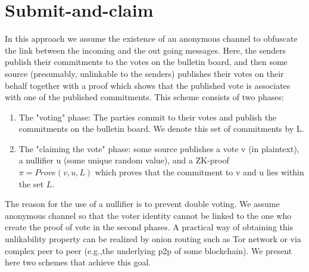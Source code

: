 \documentclass[]{article}
\begin{document}
	\section {Submit-and-claim}
	In this approach we assume the existence of an anonymous channel to obfuscate the link between the incoming and the out going messages. Here, the senders publish their commitments to the votes on the bulletin board, and then some source (presumably, unlinkable to the senders) publishes their votes on their behalf together with a proof which shows that the published vote is associates with one of the published commitments. This scheme consists of two phases:
	\begin{enumerate} 
		\item  The "voting" phase: The parties commit to their votes and publish the commitments on the bulletin board. We denote this set of commitments by L.
		\item The "claiming the vote" phase: some source publishes a vote v (in plaintext), a nullifier u (some unique random value), and a ZK-proof $\pi = Prove(v,u,L)$  which proves that the commitment to v and u lies within the set $L$.
	\end{enumerate}
	The reason for the use of a nullifier is to prevent double voting. We assume anonymous channel so that the voter identity cannot be linked to the one who create the proof of vote in the second phases.
	A practical way of obtaining this unlikability property can be realized by onion routing such as Tor network or via complex peer to peer (e.g.,the underlying p2p of some blockchain).
	We present here two schemes that achieve this goal. 
		
		
		
		
\end{document}
